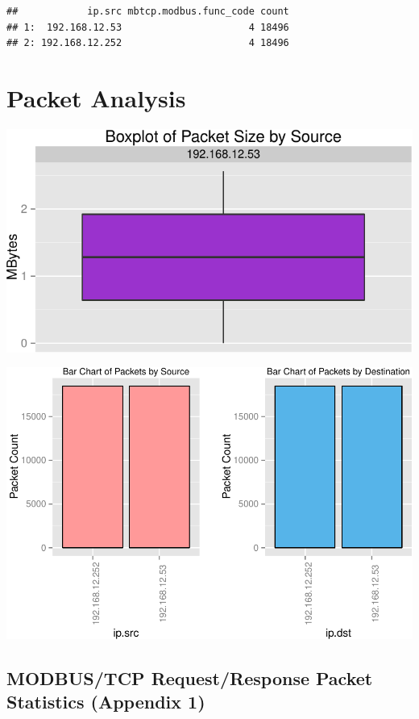 \documentclass[]{article}
\begin{document}
\begin{verbatim}
##            ip.src mbtcp.modbus.func_code count
## 1:  192.168.12.53                      4 18496
## 2: 192.168.12.252                      4 18496
\end{verbatim}

\section{Packet Analysis}\label{packet-analysis}

\begin{center}\includegraphics{modbus_files/figure-latex/unnamed-chunk-10-1} \end{center}

\includegraphics{modbus_files/figure-latex/unnamed-chunk-11-1.pdf}

\pagebreak

\subsection{MODBUS/TCP Request/Response Packet Statistics (Appendix
1)}\label{modbustcp-requestresponse-packet-statistics-appendix-1}
\end{document}
